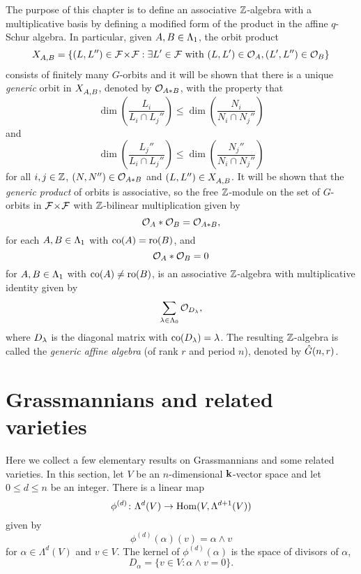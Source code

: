\documentclass[a4paper, 11pt, twoside]{report}
\begin{document}
The purpose of this chapter is to define an associative $\mathbb{Z}$-algebra with a multiplicative basis by defining a modified form of the product in the affine $q$-Schur algebra. In particular, given $A,B\in\Lambda_1{}$, the orbit product
\begin{equation*}
X_{A,B}^{} = \{(L,L'')\in{\mathcal{F}\!\times\!\mathcal{F}}: \exists L'\in\mathcal{F}\text{ with } (L,L')\in\mathcal{O}_{A}, (L',L'')\in\mathcal{O}_{B}\}
\end{equation*}
consists of finitely many $G$-orbits and it will be shown that there is a unique \emph{generic} orbit in $X_{A,B}^{}$, denoted by $\mathcal{O}_{A\ast B}$, with the property that
\begin{equation*}
\dim\left(\frac{L_i}{L_i\cap L_j''}\right)\le\dim\left(\frac{N_i}{N_i\cap N_j''}\right)
\end{equation*}
and
\begin{equation*}
\dim\left(\frac{L_j''}{L_i\cap L_j''}\right)\le\dim\left(\frac{N_j''}{N_i\cap N_j''}\right)
\end{equation*}
for all $i,j\in\mathbb{Z}$, $(N,N'')\in\mathcal{O}_{A\ast B}$ and $(L,L'')\in X_{A,B}^{}$. It will be shown that the \emph{generic product} of orbits is associative, so the free $\mathbb{Z}$-module on the set of $G$-orbits in ${\mathcal{F}\!\times\!\mathcal{F}}$ with $\mathbb{Z}$-bilinear multiplication given by
\begin{equation*}
\mathcal{O}_{A}\ast\mathcal{O}_{B}=\mathcal{O}_{A\ast B},
\end{equation*}
for each $A,B\in\Lambda_1{}$ with $\operatorname{co}(A)=\operatorname{ro}(B)$, and
\begin{equation*}
\mathcal{O}_{A}\ast\mathcal{O}_{B} = 0
\end{equation*}
for $A,B\in\Lambda_1{}$ with $\operatorname{co}(A)\neq\operatorname{ro}(B)$, is an associative $\mathbb{Z}$-algebra with multiplicative identity given by
\begin{equation*}
\sum_{\lambda\in\Lambda_0{}} \mathcal{O}_{D_{\lambda}},
\end{equation*}
where $D_{\lambda}$ is the diagonal matrix with $\operatorname{co}(D_{\lambda})=\lambda$. The resulting $\mathbb{Z}$-algebra is called the \emph{generic affine algebra} (of rank $r$ and period $n$), denoted by $\hat{G}(n,r)$.



\section{Grassmannians and related varieties}

Here we collect a few elementary results on Grassmannians and some related varieties. In this section, let $V$ be an $n$-dimensional $\mathbf{k}$-vector space and let $0\le d\le n$ be an integer. There is a linear map
\begin{equation*}
\phi^{(d)}\colon\Lambda^d(V)\to\operatorname{Hom}(V,\Lambda^{d+1}(V))
\end{equation*}
given by
\begin{equation*}
\phi^{(d)}(\alpha)(v)=\alpha\wedge v
\end{equation*}
for $\alpha\in\Lambda^d(V)$ and $v\in V$.
The kernel of $\phi^{(d)}(\alpha)$ is the space of divisors of $\alpha$,
\begin{equation*}
D_\alpha=\{v\in V:\alpha\wedge v=0\}.
\end{equation*}
\end{document}
